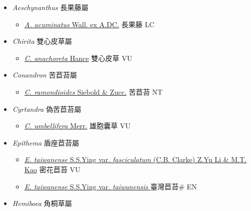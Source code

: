 
  \begin{itemize}
 \item[] \textit{Aeschynanthus} 長果藤屬
                    
  \begin{itemize}
        \item[] \href{http://www.theplantlist.org/tpl1.1/search?q=Aeschynanthus+acuminatus}{\textit{A. acuminatus} Wall. ex A.DC.}   長果藤 LC
  \end{itemize}
 \item[] \textit{Chirita} 雙心皮草屬
                    
  \begin{itemize}
        \item[] \href{http://www.theplantlist.org/tpl1.1/search?q=Chirita+anachoreta}{\textit{C. anachoreta} Hance}   雙心皮草 VU
  \end{itemize}
 \item[] \textit{Conandron} 苦苣苔屬
                    
  \begin{itemize}
        \item[] \href{http://www.theplantlist.org/tpl1.1/search?q=Conandron+ramondioides}{\textit{C. ramondioides} Siebold \& Zucc.}   苦苣苔 NT
  \end{itemize}
 \item[] \textit{Cyrtandra} 偽苦苣苔屬
                    
  \begin{itemize}
        \item[] \href{http://www.theplantlist.org/tpl1.1/search?q=Cyrtandra+umbellifera}{\textit{C. umbellifera} Merr.}   雄胞囊草 VU
  \end{itemize}
 \item[] \textit{Epithema} 盾座苣苔屬
                    
  \begin{itemize}
        \item[] \href{http://www.theplantlist.org/tpl1.1/search?q=Epithema+taiwanense+var.+fasciculatum}{\textit{E. taiwanense} S.S.Ying var. \textit{fasciculatum} (C.B. Clarke) Z.Yu Li \& M.T. Kao}   密花苣苔 VU
        \item[] \href{http://www.theplantlist.org/tpl1.1/search?q=Epithema+taiwanense+var.+taiwanensis}{\textit{E. taiwanense} S.S.Ying var. \textit{taiwanensis} }   臺灣苣苔\# EN
  \end{itemize}
 \item[] \textit{Hemiboea} 角桐草屬
                    

\end{itemize}
